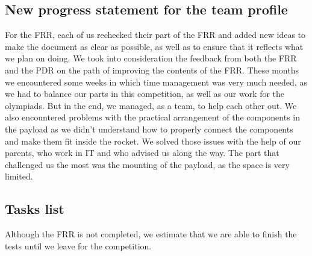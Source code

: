 \subsection{New progress statement for the team profile}

For the FRR, each of us rechecked their part of the FRR and added new ideas to make the document as clear as possible, as well as to ensure that it reflects what we plan on doing. We took into consideration the feedback from both the FRR and the PDR on the path of improving the contents of the FRR.
These months we encountered some weeks in which time management was very much needed, as we had to balance our parts in this competition, as well as our work for the olympiads. But in the end, we managed, as a team, to help each other out. We also encountered problems with the practical arrangement of the components in the payload as we didn’t understand how to properly connect the components and make them fit inside the rocket. We solved those issues with the help of our parents, who work in IT and who advised us along the way. The part that challenged us the most was the mounting of the payload, as the space is very limited. 

\subsection{Tasks list}

Although the FRR is not completed, we estimate that we are able to finish the tests until we leave for the competition.

\newcommand{\done}{\textbf{\textcolor{green!50!black}{Done}}}
\newcommand{\notdone}{\textbf{\textcolor{orange!50!black}{In progress}}}

